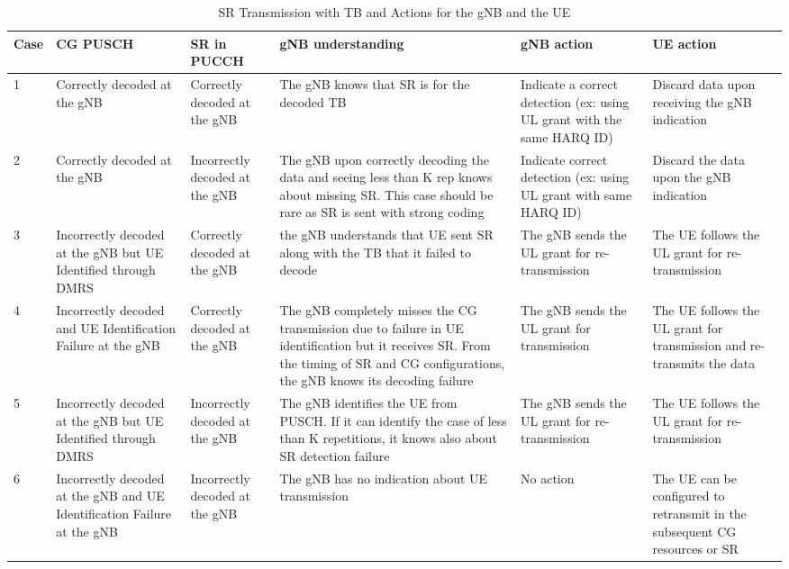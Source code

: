 \documentclass{ieeeaccess}
\begin{document}
\begin{table}[htbp]
\caption{SR Transmission with TB and Actions for the gNB and the UE}
\begin{center}
\begin{tabular}{|p{1.5em}|p{10em}|p{9em}|p{16em}|p{9em}|p{9em}|}
 \hline
 \textbf{Case} & \textbf{CG PUSCH} & \textbf{SR in PUCCH} & \textbf{gNB understanding} & \textbf{gNB action} & \textbf{UE action}\\ 
 \hline
 1 & Correctly decoded at the gNB & Correctly decoded at the gNB & The gNB knows that SR is for the decoded TB & Indicate a correct detection (ex: using UL grant with the same HARQ ID) & Discard data upon receiving the gNB indication\\
 \hline
 2 &  Correctly decoded at the gNB & Incorrectly decoded at the gNB & The gNB upon correctly decoding the data and seeing less than K rep knows about missing SR. This case should be rare as SR is sent with strong coding & Indicate correct detection (ex: using UL grant with same HARQ ID) & Discard the data upon the gNB indication\\
\hline
3 & Incorrectly decoded at the gNB but UE Identified through DMRS & Correctly decoded at the gNB & the gNB understands that UE sent SR along with the TB that it failed to decode & The gNB sends the UL grant for re-transmission & The UE follows the UL grant for re-transmission\\
\hline
4 & Incorrectly decoded and UE Identification Failure at the gNB & Correctly decoded at the gNB & The gNB completely misses the CG transmission due to failure in UE identification but it receives SR. From the timing of SR and CG configurations, the gNB knows its decoding failure & The gNB sends the UL grant for transmission & The UE follows the UL grant for transmission and re-transmits the data\\
\hline
5 & Incorrectly decoded at the gNB but UE Identified through DMRS & Incorrectly decoded at the gNB & The gNB identifies the UE from PUSCH. If it can identify the case of less than K repetitions, it knows also about SR detection failure & The gNB sends the UL grant for re-transmission & The UE follows the UL grant for re-transmission\\
\hline
 6 & Incorrectly decoded at the gNB and UE Identification Failure at the gNB & Incorrectly decoded at the gNB & The gNB has no indication about UE transmission & No action & The UE can be configured to
retransmit in the subsequent CG resources or SR\\
 

 
 \hline
\end{tabular}
\label{tab2}
\end{center}

\end{table}
\end{document}
